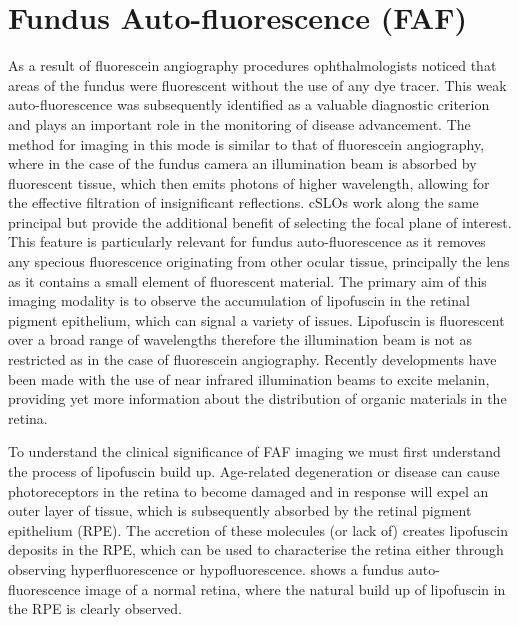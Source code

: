 \section{Fundus Auto-fluorescence (FAF)}

As a result of fluorescein angiography procedures ophthalmologists noticed that areas of the fundus were fluorescent without the use of any dye tracer. This weak auto-fluorescence was subsequently identified as a valuable diagnostic criterion and plays an important role in the monitoring of disease advancement. The method for imaging in this mode is similar to that of fluorescein angiography, where in the case of the fundus camera an illumination beam is absorbed by fluorescent tissue, which then emits photons of higher wavelength, allowing for the effective filtration of insignificant reflections. cSLOs work along the same principal but provide the additional benefit of selecting the focal plane of interest. This feature is particularly relevant for fundus auto-fluorescence as it removes any specious fluorescence originating from other ocular tissue, principally the lens as it contains a small element of fluorescent material. The primary aim of this imaging modality is to observe the accumulation of lipofuscin in the retinal pigment epithelium, which can signal a variety of issues. Lipofuscin is fluorescent over a broad range of wavelengths therefore the illumination beam is not as restricted as in the case of fluorescein angiography. Recently developments have been made with the use of near infrared illumination beams to excite melanin, providing yet more information about the distribution of organic materials in the retina. 

To understand the clinical significance of FAF imaging we must first understand the process of lipofuscin build up. Age-related degeneration or disease can cause photoreceptors in the retina to become damaged and in response will expel an outer layer of tissue, which is subsequently absorbed by the retinal pigment epithelium (RPE). The accretion of these molecules (or lack of) creates lipofuscin deposits in the RPE, which can be used to characterise the retina either through observing hyperfluorescence or hypofluorescence. shows a fundus auto-fluorescence image of a normal retina, where the natural build up of lipofuscin in the RPE is clearly observed. 

